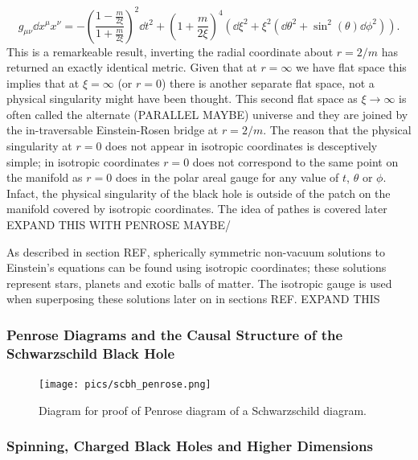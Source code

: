 \begin{equation}
g_{\mu\nu} \dd x^\mu x^\nu = -\left(\frac{1-\frac{m}{2\xi}}{1+\frac{m}{2\xi}} \right)^2 \dd t^2 + \left(1+\frac{m}{2\xi} \right)^4 \left(\dd \xi^2 + \xi^2(\dd \theta^2 + \sin^2 (\theta) \dd \phi^2) \right).
\end{equation}
This is a remarkeable result, inverting the radial coordinate about $r=2/m$ has returned an exactly identical metric. Given that at $r=\infty$ we have flat space this implies that at $\xi=\infty$ (or $r=0$) there is another separate flat space, not a physical singularity might have been thought. This second flat space as $\xi\rightarrow \infty$ is often called the alternate (PARALLEL MAYBE) universe and they are joined by the in-traversable Einstein-Rosen bridge at $r=2/m$. The reason that the physical singularity at $r=0$ does not appear in isotropic coordinates is desceptively simple; in isotropic coordinates $r=0$ does not correspond to the same point on the manifold as $r=0$ does in the polar areal gauge for any value of $t$, $\theta$ or $\phi$. Infact, the physical singularity of the black hole is outside of the patch on the manifold covered by isotropic coordinates. The idea of pathes is covered later EXPAND THIS WITH PENROSE MAYBE/


As described in section REF, spherically symmetric non-vacuum solutions to Einstein's equations can be found using isotropic coordinates; these solutions represent stars, planets and exotic balls of matter. The isotropic gauge is used when superposing these solutions later on in sections REF. EXPAND THIS

\subsubsection{Penrose Diagrams and the Causal Structure of the Schwarzschild Black Hole}

\begin{figure}[H]
\centering
    \texttt{[image: pics/scbh\_penrose.png]}
    \caption{Diagram for proof of Penrose diagram of a Schwarzschild diagram.}
    \label{intro:fig:scbh_penrose}
\end{figure}



\subsubsection{Spinning, Charged Black Holes and Higher Dimensions}



